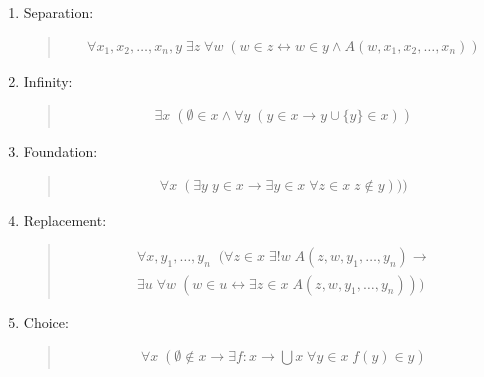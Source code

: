 \documentclass[letterpaper,10pt,english]{sphinxmanual}
\begin{document}
\begin{enumerate}
\item {} 
\sphinxAtStartPar
Separation:
\begin{quote}
\begin{equation*}
\begin{split}\forall x_1, x_2, \ldots, x_n, y \; \exists z \; \forall w \; (w \in z \leftrightarrow w \in y \wedge A(w,x_1, x_2, \ldots, x_n))\end{split}
\end{equation*}\end{quote}

\item {} 
\sphinxAtStartPar
Infinity:
\begin{quote}
\begin{equation*}
\begin{split}\exists x \; (\emptyset \in x \wedge \forall y \; (y \in x \rightarrow y \cup \{ y \} \in x))\end{split}
\end{equation*}\end{quote}

\item {} 
\sphinxAtStartPar
Foundation:
\begin{quote}
\begin{equation*}
\begin{split}\forall x \; (\exists y \; y \in x \to \exists y \in x \; \forall z \in x \; z \notin y)))\end{split}
\end{equation*}\end{quote}

\item {} 
\sphinxAtStartPar
Replacement:
\begin{quote}
\begin{equation*}
\begin{split}\forall x, y_1, \ldots, y_n \;\; (\forall z \in x \; \exists ! w \; A(z, w, y_1, \ldots, y_n) \rightarrow \\
\exists u \; \forall w \; (w \in u \leftrightarrow \exists z \in x \; A(z, w, y_1, \ldots, y_n)))\end{split}
\end{equation*}\end{quote}

\item {} 
\sphinxAtStartPar
Choice:
\begin{quote}
\begin{equation*}
\begin{split}\forall x \; (\emptyset \notin x \rightarrow \exists f : x \to \bigcup x \; \forall y \in x \; f(y) \in y)\end{split}
\end{equation*}\end{quote}

\end{enumerate}
\end{document}
